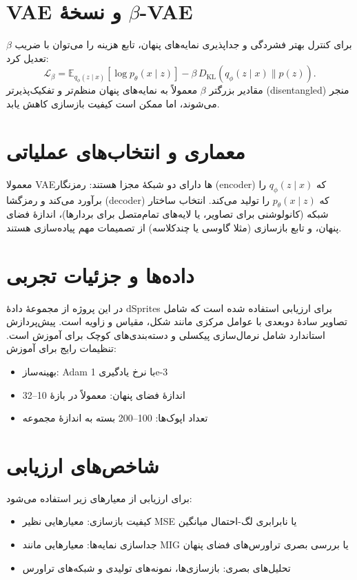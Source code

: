 \section{VAE و نسخهٔ $\beta$-VAE}
برای کنترل بهتر فشردگی و جداپذیری نمایه‌های پنهان، تابع هزینه را می‌توان با ضریب $\beta$ تعدیل کرد:
$$
\mathcal{L}_\beta = \mathbb{E}_{q_\phi(z\mid x)}[\log p_\theta(x\mid z)] - \beta\, D_{\mathrm{KL}}(q_\phi(z\mid x)\|p(z)).
$$
مقادیر بزرگتر $\beta$ معمولاً به نمایه‌های پنهان منظم‌تر و تفکیک‌پذیرتر (disentangled) منجر می‌شوند، اما ممکن است کیفیت بازسازی کاهش یابد.

\section{معماری و انتخاب‌های عملیاتی}
معمولا VAEها دارای دو شبکهٔ مجزا هستند: رمزنگار (encoder) که $q_\phi(z\mid x)$ را برآورد می‌کند و رمزگشا (decoder) که $p_\theta(x\mid z)$ را تولید می‌کند. انتخاب ساختار شبکه (کانولوشنی برای تصاویر، یا لایه‌های تمام‌متصل برای بردارها)، اندازهٔ فضای پنهان، و تابع بازسازی (مثلا گاوسی یا چندکلاسه) از تصمیمات مهم پیاده‌سازی هستند.

\section{داده‌ها و جزئیات تجربی}
در این پروژه از مجموعهٔ دادهٔ dSprites برای ارزیابی استفاده شده است که شامل تصاویر سادهٔ دو‌بعدی با عوامل مرکزی مانند شکل، مقیاس و زاویه است. پیش‌پردازش استاندارد شامل نرمال‌سازی پیکسلی و دسته‌بندی‌های کوچک برای آموزش است. تنظیمات رایج برای آموزش:
\begin{itemize}
    \item بهینه‌ساز: Adam با نرخ یادگیری 1e-3
    \item اندازهٔ فضای پنهان: معمولاً در بازهٔ 10--32
    \item تعداد اپوک‌ها: 100--200 بسته به اندازهٔ مجموعه
\end{itemize}

\section{شاخص‌های ارزیابی}
برای ارزیابی از معیارهای زیر استفاده می‌شود:
\begin{itemize}
    \item کیفیت بازسازی: معیارهایی نظیر MSE یا نابرابری لگ-احتمال میانگین
    \item جداسازی نمایه‌ها: معیارهایی مانند MIG یا بررسی بصری تراورس‌های فضای پنهان
    \item تحلیل‌های بصری: بازسازی‌ها، نمونه‌های تولیدی و شبکه‌های تراورس
\end{itemize}


